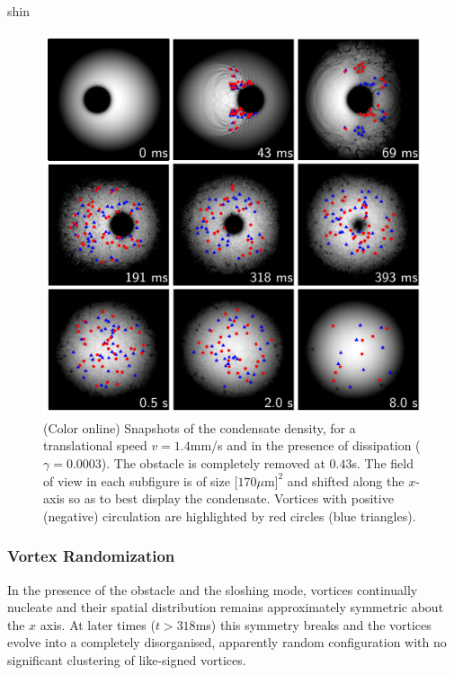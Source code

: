 \begin{chapter}{\label{cha:shin}shin}
\begin{figure}
\includegraphics[width=\linewidth]{shin/fig2}
\caption{\label{fig:densSnapshots} (Color online) Snapshots of the condensate density, for a translational speed $v=1.4$mm/s and in the presence of dissipation ($\gamma=0.0003$). The obstacle is completely removed at $0.43$s. The field of view in each subfigure is of size $[170\mu$m$]^2$ and shifted along the $x$-axis so as to best display the condensate.  Vortices with positive (negative) circulation are highlighted by red circles (blue triangles).
}
\end{figure}

\subsubsection{Vortex Randomization}
In the presence of the obstacle and the sloshing mode,
vortices continually nucleate and their spatial distribution remains
approximately symmetric about the $x$ axis.  
At later times ($t>318$ms) this symmetry breaks and the vortices 
evolve into a completely disorganised, apparently random 
configuration with no significant clustering of like-signed vortices.  


\end{chapter}
